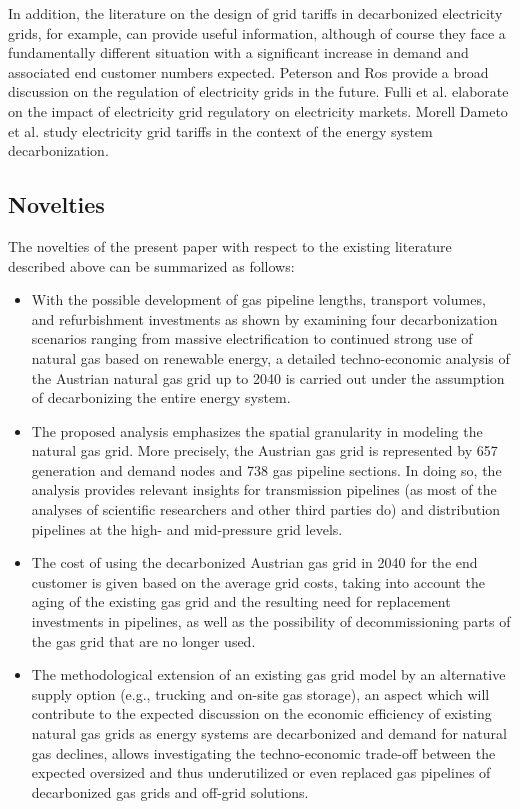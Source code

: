 In addition, the literature on the design of grid tariffs in decarbonized electricity grids, for example, can provide useful information, although of course they face a fundamentally different situation with a significant increase in demand and associated end customer numbers expected. Peterson and Ros \cite{peterson2018future} provide a broad discussion on the regulation of electricity grids in the future. Fulli et al. \cite{fulli2019change} elaborate on the impact of electricity grid regulatory on electricity markets. Morell Dameto et al. \cite{morell2020revisiting} study electricity grid tariffs in the context of the energy system decarbonization. 

\subsection{Novelties}\label{novelties}
The novelties of the present paper with respect to the existing literature described above can be summarized as follows: 

\begin{itemize}
	\item With the possible development of gas pipeline lengths, transport volumes, and refurbishment investments as shown by examining four decarbonization scenarios ranging from massive electrification to continued strong use of natural gas based on renewable energy, a detailed techno-economic analysis of the Austrian natural gas grid up to 2040 is carried out under the assumption of decarbonizing the entire energy system.
	\item The proposed analysis emphasizes the spatial granularity in modeling the natural gas grid. More precisely, the Austrian gas grid is represented by 657 generation and demand nodes and 738 gas pipeline sections. In doing so, the analysis provides relevant insights for transmission pipelines (as most of the analyses of scientific researchers and other third parties do) and distribution pipelines at the high- and mid-pressure grid levels.
	\item The cost of using the decarbonized Austrian gas grid in 2040 for the end customer is given based on the average grid costs, taking into account the aging of the existing gas grid and the resulting need for replacement investments in pipelines, as well as the possibility of decommissioning parts of the gas grid that are no longer used.
	\item The methodological extension of an existing gas grid model by an alternative supply option (e.g., trucking and on-site gas storage), an aspect which will contribute to the expected discussion on the economic efficiency of existing natural gas grids as energy systems are decarbonized and demand for natural gas declines, allows investigating the techno-economic trade-off between the expected oversized and thus underutilized or even replaced gas pipelines of decarbonized gas grids and off-grid solutions. 
\end{itemize}